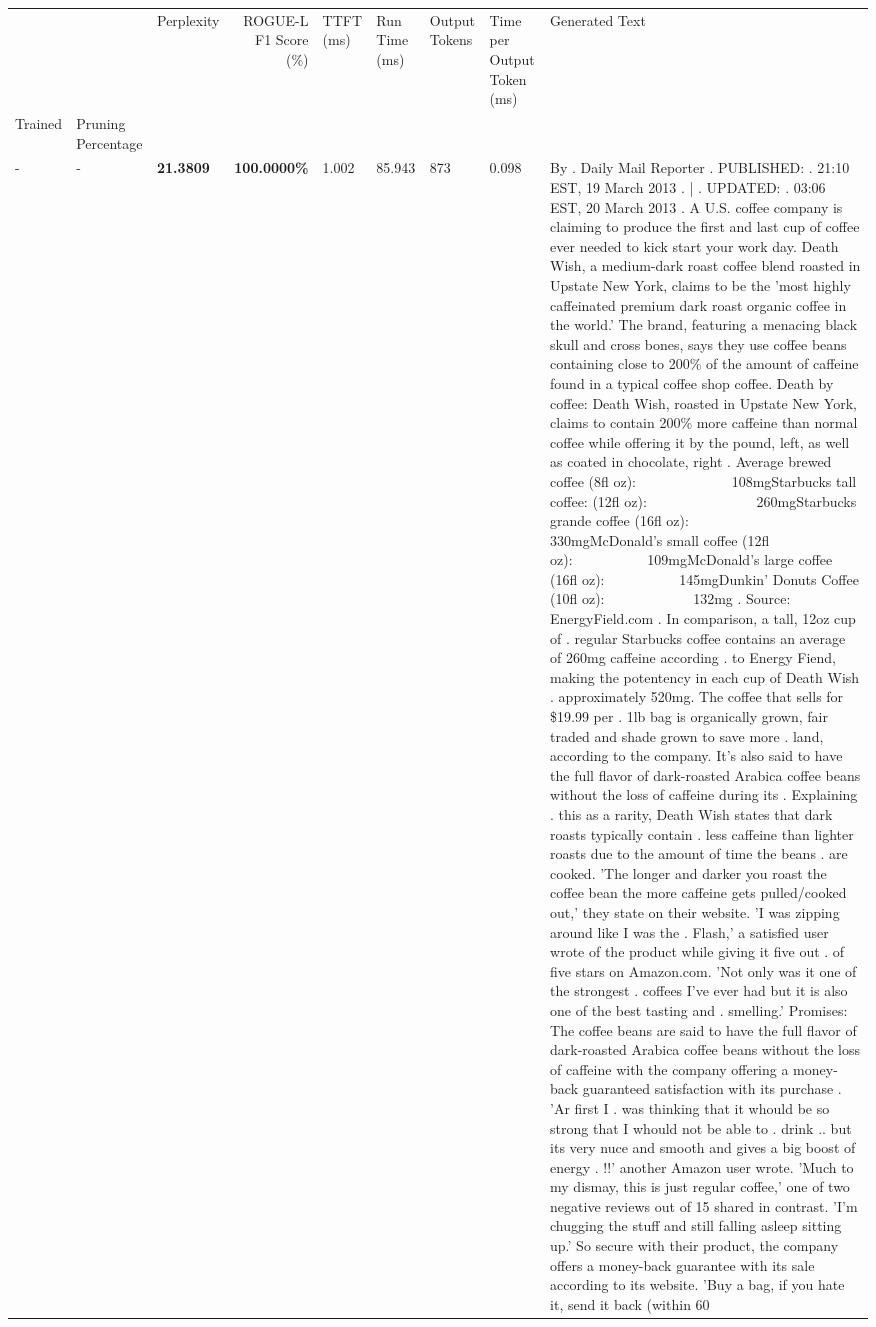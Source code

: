 \begin{table}[H]
{\label{tab:evaluation-pipeline-6}
\begin{tabular}{lllrlllll}
\toprule
 &  & Perplexity & ROGUE-L F1 Score (\%) & TTFT (ms) & Run Time (ms) & Output Tokens & Time per Output Token (ms) & Generated Text \\
Trained & Pruning Percentage &  &  &  &  &  &  &  \\
\midrule
- & - & \bfseries 21.3809 & \bfseries 100.0000\% & 1.002 & 85.943 & 873 & 0.098 & By . Daily Mail Reporter . PUBLISHED: . 21:10 EST, 19 March 2013 . | . UPDATED: . 03:06 EST, 20 March 2013 . A U.S. coffee company is claiming to produce the first and last cup of coffee ever needed to kick start your work day. Death Wish, a medium-dark roast coffee blend roasted in Upstate New York, claims to be the 'most highly caffeinated premium dark roast organic coffee in the world.' The brand, featuring a menacing black skull and cross bones, says they use coffee beans containing close to 200\% of the amount of caffeine found in a typical coffee shop coffee. Death by coffee: Death Wish, roasted in Upstate New York, claims to contain 200\% more caffeine than normal coffee while offering it by the pound, left, as well as coated in chocolate, right . Average brewed coffee (8fl oz):              108mgStarbucks tall coffee: (12fl oz):                260mgStarbucks grande coffee (16fl oz):         330mgMcDonald's small coffee (12fl oz):           109mgMcDonald's large coffee (16fl oz):           145mgDunkin' Donuts Coffee (10fl oz):             132mg . Source: EnergyField.com . In comparison, a tall, 12oz cup of . regular Starbucks coffee contains an average of 260mg caffeine according . to Energy Fiend, making the potentency in each cup of Death Wish . approximately 520mg. The coffee that sells for \$19.99 per . 1lb bag is organically grown, fair traded and shade grown to save more . land, according to the company. It's also said to have the full flavor of dark-roasted Arabica coffee beans without the loss of caffeine during its . Explaining . this as a rarity, Death Wish states that dark roasts typically contain . less caffeine than lighter roasts due to the amount of time the beans . are cooked. 'The longer and darker you roast the coffee bean the more caffeine gets pulled/cooked out,' they state on their website. 'I was zipping around like I was the . Flash,' a satisfied user wrote of the product while giving it five out . of five stars on Amazon.com. 'Not only was it one of the strongest . coffees I've ever had but it is also one of the best tasting and . smelling.’ Promises: The coffee beans are said to have the full flavor of dark-roasted Arabica coffee beans without the loss of caffeine with the company offering a money-back guaranteed satisfaction with its purchase . 'Ar first I . was thinking that it whould be so strong that I whould not be able to . drink .. but its very nuce and smooth and gives a big boost of energy . !!' another Amazon user wrote. 'Much to my dismay, this is just regular coffee,' one of two negative reviews out of 15 shared in contrast. 'I'm chugging the stuff and still falling asleep sitting up.' So secure with their product, the company offers a money-back guarantee with its sale according to its website. 'Buy a bag, if you hate it, send it back (within 60 
\end{tabular}}
\end{table}

